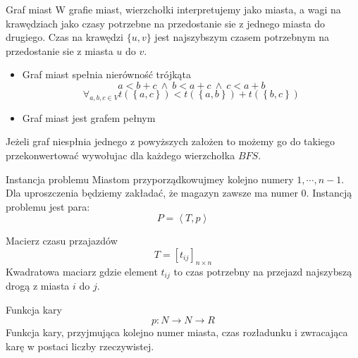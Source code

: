 \begin{frame}
	\begin{block}{Graf miast}
		W grafie miast, wierzchołki interpretujemy jako miasta, a wagi na krawędziach jako czasy potrzebne na przedostanie sie z jednego miasta do drugiego.
		Czas na krawędzi $\{u, v\}$ jest najszybszym czasem potrzebnym na przedostanie sie z miasta $u$ do $v$.
		\begin{itemize}
			\item Graf miast spełnia nierówność trójkąta
				\begin{equation}
					a < b + c \ \wedge \ b < a + c \ \wedge \ c < a + b
				\end{equation}
				\begin{equation}
					\forall_{a,b,c \in V} t(\left\{a, c\right\}) < t(\left\{a, b\right\}) + t(\left\{b, c\right\})
				\end{equation}
			\item Graf miast jest grafem pełnym
		\end{itemize}
		Jeżeli graf niespłnia jednego z powyższych założen to możemy go do takiego przekonwertować wywołujac dla każdego wierzchołka $BFS$.
	\end{block}
\end{frame}

\begin{frame}
	\begin{block}{Instancja problemu}
		Miastom przyporządkowujmey kolejno numery $1, \cdots, n-1$.
		Dla uproszczenia będziemy zakładać, że magazyn zawsze ma numer $0$.
		Instancją problemu jest para:
		\begin{equation}
			P = \left< T, p \right>
		\end{equation}
	\end{block}
	\begin{block}{Macierz czasu przajazdów}		
		\begin{equation}
			T = \left[ t_{ij} \right]_{n \times n} 
		\end{equation}
		Kwadratowa maciarz gdzie element $t_{ij}$ to czas potrzebny na przejazd najszybszą drogą z miasta $i$ do $j$.
	\end{block}
	\begin{block}{Funkcja kary}
		\begin{equation}
			p : N \rightarrow N \rightarrow R 
		\end{equation}
		Funkcja kary, przyjmująca kolejno numer miasta, czas rozładunku i zwracająca karę w postaci liczby rzeczywistej.
	\end{block}
\end{frame}

